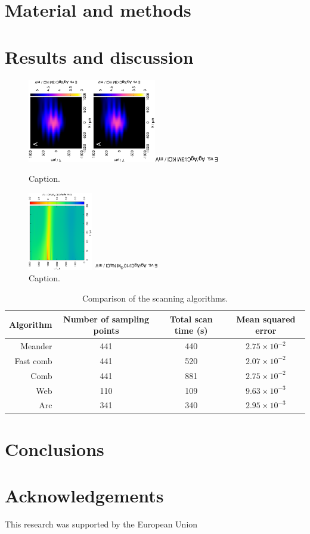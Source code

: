\documentclass[3p]{elsarticle}
\begin{document}
\section{Material and methods}
\section{Results and discussion}

\def\s{0.25}
\begin{figure}
\centering
\includegraphics[trim = 10mm 20mm 0mm 10mm, clip, width=\s\textwidth, angle=-90]{gnuplot_2d.eps}\includegraphics[trim = 10mm 20mm 0mm 10mm, clip, width=\s\textwidth, angle=-90]{gnuplot_2d.eps}\includegraphics[trim = 10mm 20mm 0mm 10mm, clip, width=\s\textwidth, angle=-90]{gnuplot_2d_deconvoluted.eps}
\caption{Caption.}
\label{fig:label1}
\end{figure}

\begin{figure}
\centering
\includegraphics[width=\s\textwidth, angle=-90]{test.eps}

\includegraphics[width=\s\textwidth, angle=-90]{test_deconvoluted.eps}
\caption{Caption.}
\label{fig:label1}
\end{figure}


\begin{table}
                \caption{Comparison of the scanning algorithms.}
                \label{table:comp}
                \centering
                \begin{tabular}{r c c c}
                        Algorithm & Number of sampling points & Total scan time (s) & Mean squared error \\
                        \hline
                        Meander & 441 & 440 & $2.75\times 10^{-2}$ \\
                        Fast comb & 441 & 520  & $2.07\times 10^{-2}$ \\
                        Comb & 441 & 881 & $2.75\times 10^{-2}$ \\
                        Web & 110 & 109 & $9.63\times 10^{-3}$ \\
                        Arc & 341 & 340 & $2.95\times 10^{-3}$ \\

                \end{tabular}

\end{table}

\section{Conclusions}
\section*{Acknowledgements}
This research was supported by the European Union 
\end{document}
